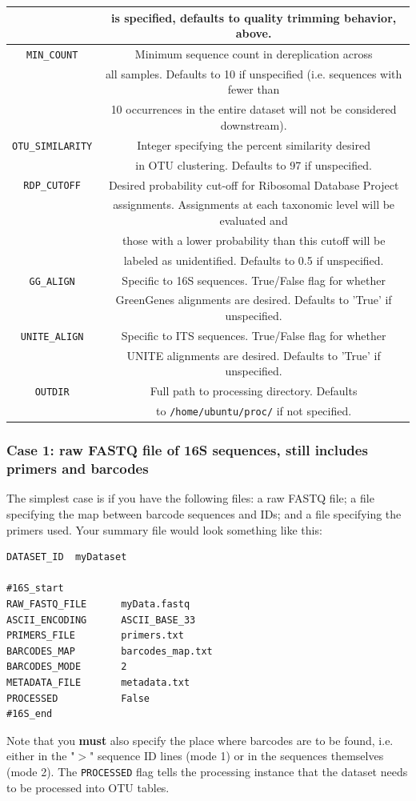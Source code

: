 \documentclass[11pt, oneside]{article}   	%
\begin{document}
\begin{center}
\begin{longtable}{| c | c |}
		& is specified, defaults to quality trimming behavior, above. \\
		\hline
        {\tt MIN\_COUNT} & Minimum sequence count in dereplication across \\
        & all samples.  Defaults to 10 if unspecified (i.e. sequences with fewer than  \\
        & 10 occurrences in the entire dataset will not be considered downstream). \\
        \hline
        {\tt OTU\_SIMILARITY} & Integer specifying the percent similarity desired \\
         &  in OTU clustering.  Defaults to 97 if unspecified. \\
	\hline
	{\tt RDP\_CUTOFF} & Desired probability cut-off for Ribosomal Database Project \\
	& assignments.  Assignments at each taxonomic level will be evaluated and \\
	& those with a lower probability than this cutoff will be \\
	& labeled as unidentified. Defaults to 0.5 if unspecified. \\
	\hline
	{\tt GG\_ALIGN} & Specific to 16S sequences.  True/False flag for whether \\
	& GreenGenes alignments are desired.  Defaults to 'True' if unspecified. \\
	\hline
	{\tt UNITE\_ALIGN} & Specific to ITS sequences.  True/False flag for whether \\
	& UNITE alignments are desired.  Defaults to 'True' if unspecified. \\
	\hline
	{\tt OUTDIR} & Full path to processing directory. Defaults \\
	& to {\tt /home/ubuntu/proc/} if not specified. \\
	\hline
\end{longtable}
\end{center}

\subsubsection{Case 1: raw FASTQ file of 16S sequences, still includes primers and barcodes}
The simplest case is if you have the following files: a raw FASTQ file; a file specifying the map between barcode sequences and IDs; and a file specifying the primers used.  Your summary file would look something like this:

\begin{verbatim}
DATASET_ID	myDataset

#16S_start
RAW_FASTQ_FILE      myData.fastq
ASCII_ENCODING      ASCII_BASE_33
PRIMERS_FILE        primers.txt
BARCODES_MAP        barcodes_map.txt
BARCODES_MODE       2
METADATA_FILE       metadata.txt
PROCESSED           False
#16S_end
\end{verbatim}
Note that you \textbf{must} also specify the place where barcodes are to be found, i.e. either in the "$>$" sequence ID lines (mode 1) or in the sequences themselves (mode 2).  The {\tt PROCESSED} flag tells the processing instance that the dataset needs to be processed into OTU tables.
\end{document}
